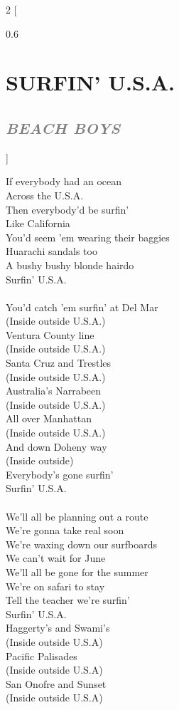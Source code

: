 \documentclass[100pt,a4paper]{report}
\newenvironment{song2}[2]
	{	
    	\begin{multicols*}{2}
		[
			\begin{spacing}{0.6}
				\section*{\LARGE\centering \MakeUppercase{\textbf{{#1}}}}
				\subsection*{\Large\centering \textit{\textcolor{gray}{\MakeUppercase{{#2}}}}}
			\end{spacing}
		]
		\Large
	}
	{
	\end{multicols*}
	\newpage
    }
\begin{document}
\begin{song2}{Surfin' U.S.A.}{Beach Boys}
\noindent
If everybody had an ocean\\
Across the U.S.A.\\
Then everybody'd be surfin'\\
Like California\\
You'd seem 'em wearing their baggies\\
Huarachi sandals too\\
A bushy bushy blonde hairdo\\
Surfin' U.S.A.\\
\\
You'd catch 'em surfin' at Del Mar\\
(Inside outside U.S.A.)\\
Ventura County line\\
(Inside outside U.S.A.)\\
Santa Cruz and Trestles\\
(Inside outside U.S.A.)\\
Australia's Narrabeen\\
(Inside outside U.S.A.)\\
All over Manhattan\\
(Inside outside U.S.A.)\\
And down Doheny way\\
(Inside outside)\\
Everybody's gone surfin'\\
Surfin' U.S.A.\\
\\
We'll all be planning out a route\\
We're gonna take real soon\\
We're waxing down our surfboards\\
We can't wait for June\\
We'll all be gone for the summer\\
We're on safari to stay\\
Tell the teacher we're surfin'\\
Surfin' U.S.A.\\
\vfill
\columnbreak
\noindent
Haggerty's and Swami's\\
(Inside outside U.S.A)\\
Pacific Palisades\\
(Inside outside U.S.A)\\
San Onofre and Sunset\\
(Inside outside U.S.A)\\

\end{song2}
\end{document}
